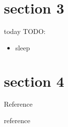 \documentclass[11pt,xcolor=dvipsnames,table,dvipdfmx]{beamer}
\begin{document}
\section{section 3}
\begin{frame}{today}
 TODO:
 \begin{itemize}
  \item sleep
 \end{itemize}
\end{frame}

\section{section 4}
\begin{frame}{Reference}
 \begin{thebibliography}{9}
	  \small{reference}
 \end{thebibliography}
\end{frame}
\end{document}
